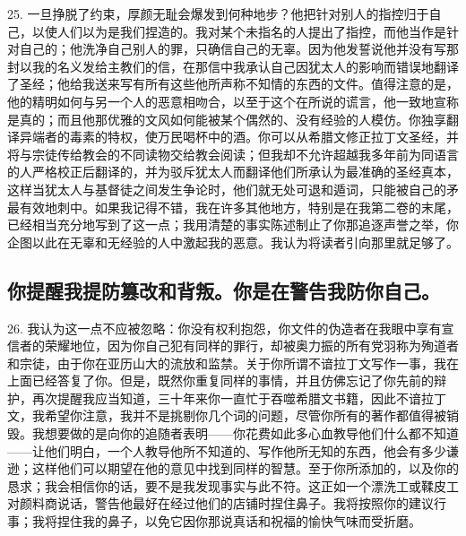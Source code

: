 25. 一旦挣脱了约束，厚颜无耻会爆发到何种地步？他把针对别人的指控归于自己，以使人们以为是我们捏造的。我对某个未指名的人提出了指控，而他当作是针对自己的；他洗净自己别人的罪，只确信自己的无辜。因为他发誓说他并没有写那封以我的名义发给主教们的信，在那信中我承认自己因犹太人的影响而错误地翻译了圣经；他给我送来写有所有这些他所声称不知情的东西的文件。值得注意的是，他的精明如何与另一个人的恶意相吻合，以至于这个在所说的谎言，他一致地宣称是真的；而且他那优雅的文风如何能被某个偶然的、没有经验的人模仿。你独享翻译异端者的毒素的特权，使万民喝杯中的酒。你可以从希腊文修正拉丁文圣经，并将与宗徒传给教会的不同读物交给教会阅读；但我却不允许超越我多年前为同语言的人严格校正后翻译的，并为驳斥犹太人而翻译他们所承认为最准确的圣经真本，这样当犹太人与基督徒之间发生争论时，他们就无处可退和遁词，只能被自己的矛最有效地刺中。如果我记得不错，我在许多其他地方，特别是在我第二卷的末尾，已经相当充分地写到了这一点；我用清楚的事实陈述制止了你那追逐声誉之举，你企图以此在无辜和无经验的人中激起我的恶意。我认为将读者引向那里就足够了。\par


\subsection{你提醒我提防篡改和背叛。你是在警告我防你自己。}

26. 我认为这一点不应被忽略：你没有权利抱怨，你文件的伪造者在我眼中享有宣信者的荣耀地位，因为你自己犯有同样的罪行，却被奥力振的所有党羽称为殉道者和宗徒，由于你在亚历山大的流放和监禁。关于你所谓不谙拉丁文写作一事，我在上面已经答复了你。但是，既然你重复同样的事情，并且仿佛忘记了你先前的辩护，再次提醒我应当知道，三十年来你一直忙于吞噬希腊文书籍，因此不谙拉丁文，我希望你注意，我并不是挑剔你几个词的问题，尽管你所有的著作都值得被销毁。我想要做的是向你的追随者表明——你花费如此多心血教导他们什么都不知道——让他们明白，一个人教导他所不知道的、写作他所无知的东西，他会有多少谦逊；这样他们可以期望在他的意见中找到同样的智慧。至于你所添加的，以及你的恳求；我会相信你的话，要不是我发现事实与此不符。这正如一个漂洗工或鞣皮工对颜料商说话，警告他最好在经过他们的店铺时捏住鼻子。我将按照你的建议行事；我将捏住我的鼻子，以免它因你那说真话和祝福的愉快气味而受折磨。\par

